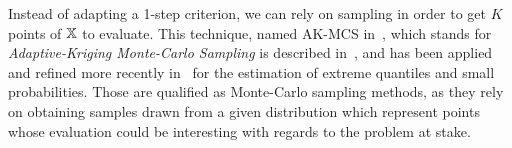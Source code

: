 \documentclass[../../Main_ManuscritThese.tex]{subfiles}
\begin{document}

Instead of adapting a 1-step criterion, we can rely on sampling in
order to get $K$ points of $\mathbb{X}$ to evaluate.  This technique,
named AK-MCS in~\cite{echard_ak-mcs_2011}, which stands for
\emph{Adaptive-Kriging Monte-Carlo Sampling} is described
in~\cite{dubourg_reliability-based_2011}, and has been applied and
refined more recently
in~\cite{schobi_rare_2017,razaaly_rare_2019,razaaly_quantile-based_2020}
for the estimation of extreme quantiles and small probabilities.
Those are qualified as Monte-Carlo sampling methods, as they rely on
obtaining samples drawn from a given distribution which represent
points whose evaluation could be interesting with regards to the
problem at stake. %
\end{document}
